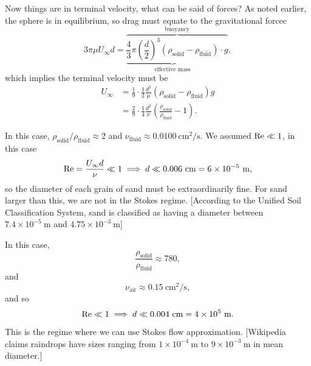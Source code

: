 \begin{example}
Now things are in terminal velocity, what can be said of forces? As
noted earlier, the sphere is in equilibrium, so drag must equate to
the gravitational forcec
\begin{equation}
3\pi\mu U_{\infty}d  = \overbrace{\underbrace{\frac{4}{3}\pi\left(\frac{d}{2}\right)^{3}(\rho_{\text{solid}}-\rho_{\text{fluid}})}_{\text{effective mass}}\cdot{}g}^{\text{buoyancy}},
\end{equation}
which implies the terminal velocity must be
\begin{subequations}
  \begin{align}
U_{\infty}
&= \frac{1}{9}\cdot\frac{1}{2}\frac{d^{2}}{\mu}(\rho_{\text{solid}}-\rho_{\text{fluid}})g\\
&= \frac{2}{9}\cdot\frac{1}{4}\frac{d^{2}}{\nu}\left(\frac{\rho_{\text{solid}}}{\rho_{\text{fluid}}}-1\right).
  \end{align}
\end{subequations}
\end{example}

\begin{example}
In this case, $\rho_{\text{solid}}/\rho_{\text{fluid}}\approx2$ and $\nu_{\text{fluid}}\approx0.0100~\mathrm{cm}^{2}/\mathrm{s}$.
We assumed $\mathrm{Re}\ll1$, in this case
\begin{equation}
\mathrm{Re}=\frac{U_{\infty}d}{\nu}\ll1\implies d\ll0.006~\mathrm{cm}=6\times10^{-5}~\mathrm{m},
\end{equation}
so the diameter of each grain of sand must be extraordinarily
fine. For sand larger than this, we are not in the Stokes regime.
[According to the Unified Soil Classification System, sand is
  classified as having a diameter between $7.4\times10^{-5}~\mathrm{m}$
and $4.75\times10^{-3}~\mathrm{m}$]
\end{example}

\begin{example}
In this case,
\begin{equation}
\frac{\rho_{\text{solid}}}{\rho_{\text{fluid}}}\approx780,
\end{equation}
and
\begin{equation}
\nu_{\text{air}}\approx0.15~\mathrm{cm}^{2}/\mathrm{s},
\end{equation}
and so
\begin{equation}
\mathrm{Re}\ll1\implies d\ll0.004~\mathrm{cm}=4\times10^{5}~\mathrm{m}.
\end{equation}
This is the regime where we can use Stokes flow approximation.
[Wikipedia claims raindrops have sizes ranging from $1\times10^{-4}~\mathrm{m}$
to $9\times10^{-3}~\mathrm{m}$ in mean diameter.]
\end{example}

